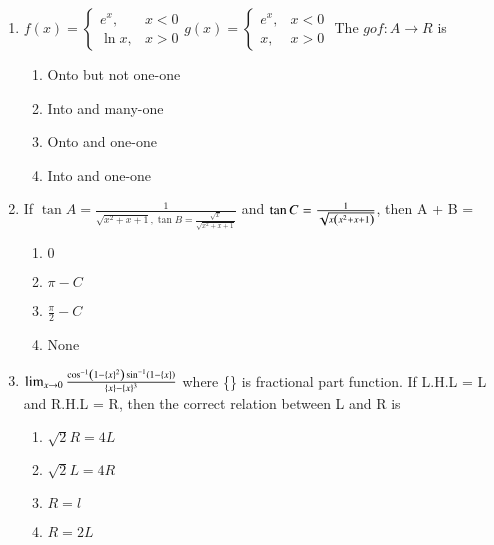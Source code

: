 \documentclass[journal,9pt,onecolumn]{IEEEtran}
\begin{document}
\begin{enumerate}
\item $f(x) = \begin{cases} 
e^x, & x < 0 \\
\ln x, & x > 0 
\end{cases} g(x) = \begin{cases} 
e^x, & x < 0 \\
x, & x > 0 
\end{cases}$ The $gof: A \to R$ is 
\begin{multicols}{2}
\begin{enumerate}
    \item Onto but not one-one
    \item Into and many-one
    \item Onto and one-one
    \item Into and one-one
\end{enumerate}
\end{multicols}



\item If $\tan A = \frac{1}{\sqrt{x^2 + x + 1}, \tan B = \frac{\sqrt{x}}{\sqrt{x^2 + x +1}} }$ and $\tan C = \frac{1}{\sqrt{x\left(x^2 + x +1\right)}}$, then A + B = 
\begin{multicols}{4}
\begin{enumerate}
    \item $0$ 
    \item $\pi - C$ 
    \item $\frac{\pi}{2} - C$ 
    \item None 
\end{enumerate}
\end{multicols}


\item $\lim_{x \to 0} \frac{\cos^{-1}\left(1 - \{x\}^2\right)\sin^{-1}\left(1 - \{x\}\right)}{\{x\} - \{x\}^3}$ where \{\} is fractional part function. If L.H.L = L and R.H.L = R, then the correct relation between L and R is
\begin{multicols}{4}
\begin{enumerate}
    \item $\sqrt{2}R = 4L$ 
    \item $\sqrt{2}L = 4R$ 
    \item $R = l$ 
    \item $R = 2L$ 
\end{enumerate}
\end{multicols}

\end{enumerate}
\end{document}
